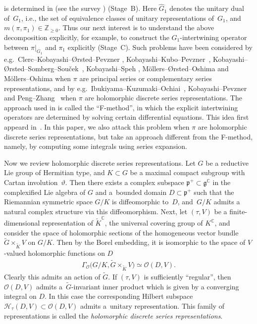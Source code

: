 \documentclass[pdftex]{sigma}
\numberwithin{equation}{section}
\newcommand{\BZ}{\mathbb{Z}}
\newcommand{\BC}{\mathbb{C}}
\newcommand{\fg}{\mathfrak{g}}
\newcommand{\fp}{\mathfrak{p}}
\newcommand{\cH}{\mathcal{H}}
\newcommand{\cO}{\mathcal{O}}
\begin{document}
is determined in \cite{Kmf0, Kmf1} (see the survey \cite{Kmf0-1}) (Stage~B). Here $\hat{G}_1$ denotes the unitary dual of~$G_1$, i.e., the set of equivalence classes of unitary representations of~$G_1$, and $m(\pi,\pi_1)\in\BZ_{\ge 0}$. Thus our next interest is to understand the above decomposition explicitly, for example, to construct the $G_1$-intertwining operator between $\pi|_{G_1}$ and $\pi_1$ explicitly (Stage~C). Such problems have been considered by e.g.\ Clerc--Kobayashi--{\O}rsted--Pevzner \cite{CKOP}, Kobayashi--Kubo--Pevzner~\cite{KKP}, Kobayashi--{\O}rsted--Somberg--Sou\v{c}ek~\cite{KOSS}, Kobayashi--Speh \cite{KS1,KS2}, M\"ollers--{\O}rsted--Oshima \cite{MOO} and M\"ollers--Oshima \cite{MO} when $\pi$ are principal series or complementary series representations, and by e.g.\ Ibukiyama--Kuzumaki--Ochiai~\cite{IKO}, Kobayashi--Pevzner~\cite{KP1,KP2} and Peng--Zhang~\cite{PZ} when $\pi$ are holomorphic discrete series representations. The approach used in \cite{KKP,KOSS,KP1,KP2} is called the ``F-method'', in which the explicit intertwining operators are determined by solving certain differential equations. This idea first appeard in~\cite{Kfmeth}. In this paper, we also attack this problem when $\pi$ are holomorphic discrete series representations, but take an approach different from the F-method, namely, by computing some integrals using series expansion.

 Now we review holomorphic discrete series representations. Let $G$ be a reductive Lie group of Hermitian type, and $K\subset G$ be a maximal compact subgroup with Cartan involution~$\vartheta$. Then there exists a complex subspace $\fp^+\subset\fg^\BC$ in the complexified Lie algebra of $G$ and a~bounded domain $D\subset\fp^+$ such that the Riemannian symmetric space $G/K$ is diffeomorphic to~$D$, and~$G/K$ admits a natural complex structure via this diffeomorphism. Next, let $(\tau,V)$ be a finite-dimensional representation of $\tilde{K}^\BC$, the universal covering group of $K^\BC$, and consider the space of holomorphic sections of the homogeneous vector bundle $\tilde{G}\times_{\tilde{K}}V$ on $G/K$. Then by the Borel embedding, it is isomorphic to the space of $V$-valued holomorphic functions on $D$
\begin{gather*} \Gamma_\cO\big(G/K,\tilde{G}\times_{\tilde{K}}V\big)\simeq \cO(D,V). \end{gather*}
Clearly this admits an action of $\tilde{G}$. If $(\tau,V)$ is sufficiently ``regular'', then $\cO(D,V)$ admits a~$\tilde{G}$-invariant inner product which is given by a converging integral on $D$. In this case the corresponding Hilbert subspace $\cH_\tau(D,V)\subset\cO(D,V)$ admits a~unitary representation. This family of representations is called the \textit{holomorphic discrete series representations}.
\end{document}

